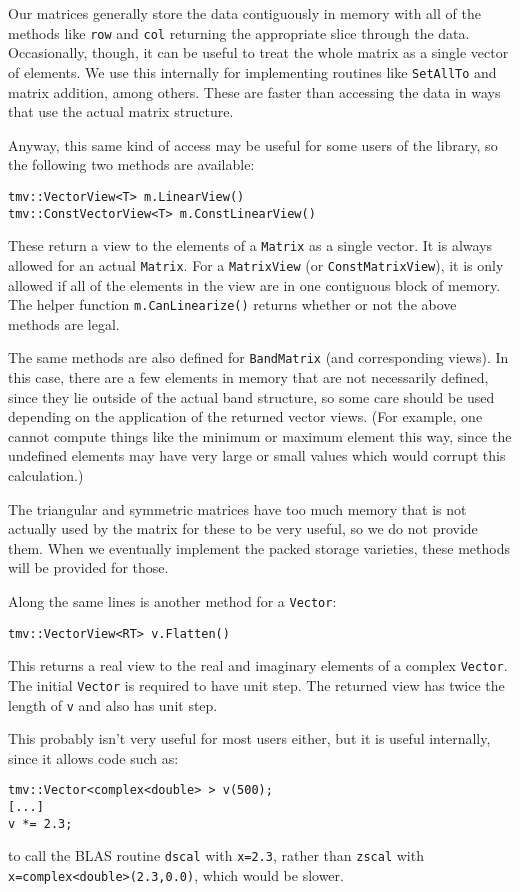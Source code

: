 \documentclass[twoside,letterpaper,11pt]{article}
\renewcommand{\tt}[1]{{\texttt {#1}}}
\begin{document}
Our matrices generally store the data contiguously in memory with all of the 
methods like \tt{row} and \tt{col} returning the appropriate slice through the
data.  Occasionally, though, it can be useful to treat the whole matrix
as a single vector of elements.  We use this internally for implementing routines
like \tt{SetAllTo} and matrix addition, among others.  These are faster than
accessing the data in ways that use the actual matrix structure.

Anyway, this same kind of access may be useful for some users of the library, 
so the following two methods are available:
\begin{verbatim}
tmv::VectorView<T> m.LinearView()
tmv::ConstVectorView<T> m.ConstLinearView()
\end{verbatim}
These return a view to the elements of a \tt{Matrix} as a single vector.  
It is always allowed for an actual \tt{Matrix}.  For a \tt{MatrixView} 
(or \tt{ConstMatrixView}), it is only allowed if all of the elements in the 
view are in one contiguous block of memory.  The helper function 
\tt{m.CanLinearize()} returns whether or not the above methods are legal.

The same methods are also defined for \tt{BandMatrix} (and corresponding views).
In this case, there are a few elements in memory that are not necessarily
defined, since they lie outside of the actual band structure, so some care
should be used depending on the application of the returned vector views.  
(For example, one cannot compute things like the
minimum or maximum element this way, since the undefined elements may
have very large or small values which would corrupt this calculation.)

The triangular and symmetric matrices have too much memory that is not
actually used by the matrix for these to be very useful, so we do not provide them.
When we eventually implement the packed storage varieties, these methods will
be provided for those.

Along the same lines is another method for a \tt{Vector}:
\begin{verbatim}
tmv::VectorView<RT> v.Flatten()
\end{verbatim}
This returns a real view to the real and imaginary elements of a complex \tt{Vector}. 
The initial \tt{Vector} is required to have unit step.  The returned view has twice the 
length of \tt{v} and also has unit step.

This probably isn't very useful for most users either, but it is useful internally,
since it allows code such as:
\begin{verbatim}
tmv::Vector<complex<double> > v(500);
[...]
v *= 2.3;
\end{verbatim}
to call the BLAS routine \tt{dscal} with \tt{x=2.3}, rather than \tt{zscal}
with \tt{x=complex<double>(2.3,0.0)}, which would be slower.
\end{document}
